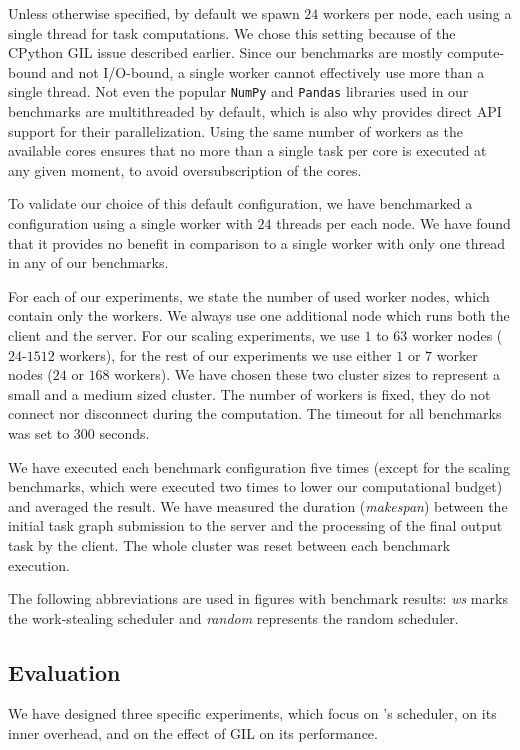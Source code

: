 Unless otherwise specified, by default we spawn $24$
\dask{} workers per node, each using a single thread for task computations. We
chose this setting because of the CPython GIL issue described earlier. Since our benchmarks are
mostly compute-bound and not I/O-bound, a single worker cannot effectively use more than a single
thread. Not even the popular \texttt{NumPy} and \texttt{Pandas} libraries
used in our benchmarks are multithreaded by default, which is also why \dask{}
provides direct API support for their parallelization. Using the same number of workers as the
available cores ensures that no more than a single task per core is executed at any given moment,
to avoid oversubscription of the cores.

To validate our choice of this default configuration, we have benchmarked a configuration using a
single worker with $24$ threads per each node. We have found that it provides
no benefit in comparison to a single worker with only one thread in any of our benchmarks.

For each of our experiments, we state the number of used worker nodes, which contain only the
workers. We always use one additional node which runs both the client and the server. For our
scaling experiments, we use $1$ to $63$ worker nodes
($24$-$1512$ \dask{} workers), for
the rest of our experiments we use either $1$ or $7$
worker nodes ($24$ or $168$ \dask{}
workers). We have chosen these two cluster sizes to represent a small and a medium sized
\dask{} cluster. The number of workers is fixed, they do not connect nor
disconnect during the computation. The timeout for all benchmarks was set to
$300$ seconds.

We have executed each benchmark configuration five times (except for the scaling benchmarks, which
were executed two times to lower our computational budget) and averaged the result. We have
measured the duration (\emph{makespan}) between the initial task graph submission to
the server and the processing of the final output task by the client. The whole cluster was reset
between each benchmark execution.

The following abbreviations are used in figures with benchmark results: \emph{ws}
marks the work-stealing scheduler and \emph{random} represents the random scheduler.

\subsection*{Evaluation}
We have designed three specific experiments, which focus on \dask{}'s
scheduler, on its inner overhead, and on the effect of GIL on its performance.

